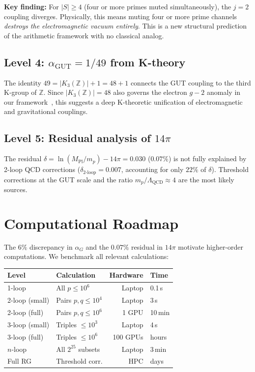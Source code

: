 \documentclass[aps,prd,twocolumn,superscriptaddress,nofootinbib]{revtex4-2}
\begin{document}
\textbf{Key finding:} For $|S|\geq 4$ (four or more primes muted
simultaneously), the $j=2$ coupling diverges.  Physically, this
means muting four or more prime channels \emph{destroys the
electromagnetic vacuum entirely}.  This is a new structural
prediction of the arithmetic framework with no classical analog.

\subsection{Level 4: $\alpha_{\mathrm{GUT}}=1/49$ from K-theory}

The identity $49=|K_3(\mathbb{Z})|+1=48+1$ connects the GUT
coupling to the third K-group of $\mathbb{Z}$.  Since
$|K_3(\mathbb{Z})|=48$ also governs the electron $g{-}2$ anomaly
in our framework~\cite{WB_arithmetic}, this suggests a deep
K-theoretic unification of electromagnetic and gravitational
couplings.

\subsection{Level 5: Residual analysis of $14\pi$}

The residual $\delta=\ln(M_{\mathrm{Pl}}/m_p)-14\pi=0.030$
($0.07\%$) is not fully explained by 2-loop QCD corrections
($\delta_{2\text{-loop}}=0.007$, accounting for only $22\%$ of
$\delta$).  Threshold corrections at the GUT scale and the ratio
$m_p/\Lambda_{\mathrm{QCD}}\approx 4$ are the most likely sources.

\section{Computational Roadmap}\label{sec:compute}

The $6\%$ discrepancy in $\alpha_G$ and the $0.07\%$ residual in
$14\pi$ motivate higher-order computations.  We benchmark all
relevant calculations:

\begin{center}
\begin{tabular}{llrl}
\toprule
Level & Calculation & Hardware & Time \\
\midrule
1-loop & All $p\leq 10^6$ & Laptop & 0.1\,s \\
2-loop (small) & Pairs $p,q\leq 10^4$ & Laptop & 3\,s \\
2-loop (full) & Pairs $p,q\leq 10^6$ & 1 GPU & 10\,min \\
3-loop (small) & Triples $\leq 10^3$ & Laptop & 4\,s \\
3-loop (full) & Triples $\leq 10^6$ & 100 GPUs & hours \\
$n$-loop & All $2^{25}$ subsets & Laptop & 3\,min \\
Full RG & Threshold corr. & HPC & days \\
\bottomrule
\end{tabular}
\end{center}
\end{document}
